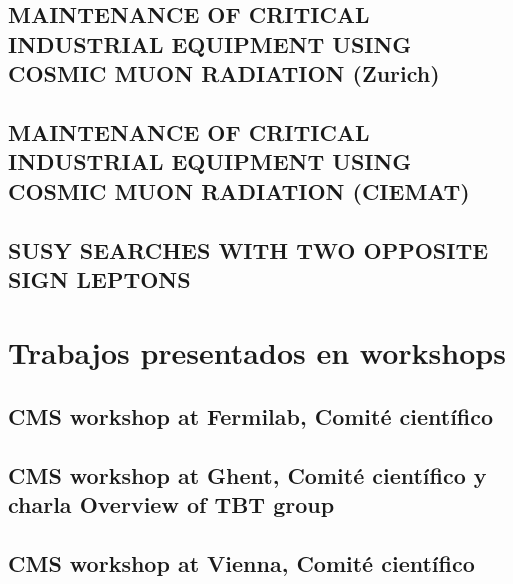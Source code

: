 \documentclass[a4paper, 11pt, twoside, openright]{report}
\begin{document}
\subsection{MAINTENANCE OF CRITICAL INDUSTRIAL EQUIPMENT USING COSMIC MUON RADIATION (Zurich)}


\subsection{MAINTENANCE OF CRITICAL INDUSTRIAL EQUIPMENT USING COSMIC MUON RADIATION (CIEMAT)}


\subsection{SUSY SEARCHES WITH TWO OPPOSITE SIGN LEPTONS}


\section{Trabajos presentados en workshops}

\subsection{CMS workshop at Fermilab, Comité científico}


\subsection{CMS workshop at Ghent, Comité científico y charla Overview of TBT group}


\subsection{CMS workshop at Vienna, Comité científico}

\end{document}
